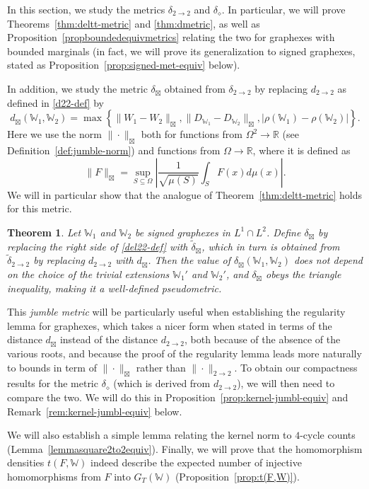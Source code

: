 \documentclass{amsart}
\numberwithin{equation}{section}
\numberwithin{figure}{section}
\newtheorem{theorem}{Theorem}[section]
\theoremstyle{definition}
\theoremstyle{remark}
\newcommand{\jbl}{{\boxtimes}}
\newcommand{\RR}{\mathbb{R}}
\newcommand{\cW}{\mathbb{W}}
\newcommand{\deltt}{\delta_{2\to 2}}
\def\d22{d_{2\to 2}}
\def\delGP{\delta_\diamond}
\def\tdel22{{\widetilde{\delta}}_{2\to 2}}
\def\djbl{d_{\jbl}}
\def\deljbl{\delta_{\jbl}}
\def\tdeljbl{\widetilde\delta_{\jbl}}
\begin{document}
In this section, we study the metrics $\deltt$ and $\delGP$. In particular,
we will prove Theorems~\ref{thm:deltt-metric} and \ref{thm:dmetric}, as well
as Proposition~\ref{propboundedequivmetrics} relating the two for graphexes
with bounded marginals (in fact, we will prove its generalization to signed
graphexes, stated as Proposition~\ref{prop:signed-met-equiv} below).

In addition, we study the metric $\deljbl$ obtained from $\deltt$ by
replacing $\d22$ as defined in \eqref{d22-def} by
\begin{equation}\label{djbl-def}
\djbl(\cW_1,\cW_2)= \max\left\{ \|W_1-W_2\|_{\jbl},
\|D_{\cW_1}-D_{\cW_2}\|_\jbl,
\left|\rho(\cW_1)-\rho(\cW_2)\right|
\right\}.
\end{equation}
Here we use the norm $\|\cdot\|_\jbl$ both for functions from $\Omega^2\to
\RR$ (see Definition~\ref{def:jumble-norm}) and functions from
$\Omega\to\RR$, where it is defined as
\[
\|F\|_\jbl=\sup_{S \subseteq \Omega} \left| \frac{1}{\sqrt{\mu(S)}}\int_{S} F(x)d\mu(x)\right|.
\]
We will in particular show that the analogue of
Theorem~\ref{thm:deltt-metric} holds for this metric.

\begin{theorem} \label{thm:deltws-metric}
Let $\cW_1$ and $\cW_2$ be signed graphexes in $L^1\cap L^2$. Define
$\deljbl$ by replacing the right side of \eqref{del22-def} with $\tdeljbl$,
which in turn is obtained from $\tdel22$ by replacing $\d22$ with $\djbl$.
Then the value of $\deljbl(\cW_1,\cW_2) $ does not depend on the choice of
the trivial extensions $\cW_1'$ and $\cW_2'$, and $\deljbl$ obeys the
triangle inequality, making it a well-defined pseudometric.
\end{theorem}

This \emph{jumble metric} will be particularly useful when establishing the
regularity lemma for graphexes, which takes a nicer form when stated in terms
of the distance $\djbl$ instead of the distance $\d22$, both because of the
absence of the various roots, and because the proof of the regularity lemma
leads more naturally to bounds in term of $\|\cdot\|_{\jbl}$ rather than
$\|\cdot\|_{2\rightarrow2}$. To obtain our compactness results for the metric
$\delGP$ (which is derived from $\d22$), we will then need to compare the
two. We will do this in Proposition~\ref{prop:kernel-jumbl-equiv} and
Remark~\ref{rem:kernel-jumbl-equiv} below.

We will also establish a simple lemma relating the kernel norm to $4$-cycle
counts (Lemma~\ref{lemmasquare2to2equiv}). Finally, we will prove that the
homomorphism densities $t(F,\cW)$ indeed describe the expected number of
injective homomorphisms from $F$ into $G_T(\cW)$
(Proposition~\ref{prop:t(F,W)}).
\end{document}
